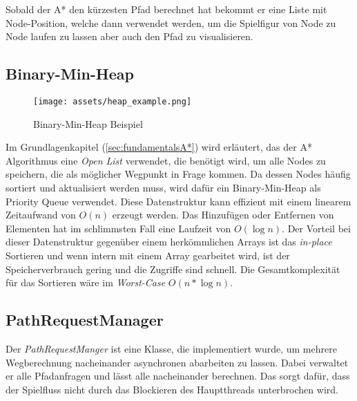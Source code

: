 Sobald der A* den kürzesten Pfad berechnet hat bekommt er eine Liste mit Node-Position, welche dann verwendet werden, um die Spielfigur von Node zu Node laufen zu lassen aber auch den Pfad zu visualisieren. 

\subsection*{Binary-Min-Heap}
\begin{wrapfigure}[11]{R}{2in - .75\columnsep}
    \vspace{-\intextsep}
    \hspace*{-.75\columnsep}
    \texttt{[image: assets/heap\_example.png]}
    \caption{Binary-Min-Heap Beispiel}
    \label{fig:aStarHeap}
\end{wrapfigure}
Im Grundlagenkapitel  (\ref{sec:fundamentalsA*}) wird erläutert, das der A* Algorithmus eine \textit{Open List} verwendet, die benötigt wird, um alle Nodes zu speichern, die als möglicher Wegpunkt in Frage kommen. Da dessen Nodes häufig sortiert und aktualisiert werden muss, wird dafür ein Binary-Min-Heap als Priority Queue verwendet. Diese Datenstruktur kann effizient mit einem linearem Zeitaufwand von $O(n)$ erzeugt werden. Das Hinzufügen oder Entfernen von Elementen hat im schlimmsten Fall eine Laufzeit von $O(\log{n})$. Der Vorteil bei dieser Datenstruktur gegenüber einem herkömmlichen Arrays ist das \textit{in-place} Sortieren und wenn intern mit einem Array gearbeitet wird, ist der Speicherverbrauch gering und die Zugriffe sind schnell. Die Gesamtkomplexität für das Sortieren wäre im \textit{Worst-Case} $O(n*\log{n})$.

\subsection*{PathRequestManager}
Der \textit{PathRequestManger} ist eine Klasse, die implementiert wurde, um mehrere Wegberechnung nacheinander asynchronen abarbeiten zu lassen. Dabei verwaltet er alle Pfadanfragen und lässt alle nacheinander berechnen. Das sorgt dafür, dass der Spielfluss nicht durch das Blockieren des Hauptthreads unterbrochen wird.
